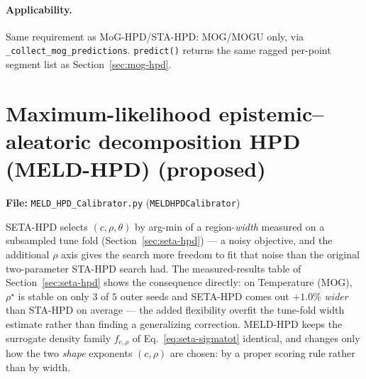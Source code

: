 \documentclass[11pt]{article}
\begin{document}
\paragraph{Applicability.} Same requirement as MoG-HPD/STA-HPD: MOG/MOGU only, via
\texttt{\_collect\_mog\_predictions}. \texttt{predict()} returns the same ragged per-point segment
list as Section~\ref{sec:mog-hpd}.

\section{Maximum-likelihood epistemic--aleatoric decomposition HPD (MELD-HPD) (proposed)}
\label{sec:meld-hpd}
\textbf{File:} \texttt{MELD\_HPD\_Calibrator.py} (\texttt{MELDHPDCalibrator})

SETA-HPD selects $(c,\rho,\theta)$ by arg-min of a region-\emph{width} measured on a subsampled
tune fold (Section~\ref{sec:seta-hpd}) --- a noisy objective, and the additional $\rho$ axis gives
the search more freedom to fit that noise than the original two-parameter STA-HPD search had. The
measured-results table of Section~\ref{sec:seta-hpd} shows the consequence directly: on
Temperature (MOG), $\rho^\star$ is stable on only $3$ of $5$ outer seeds and SETA-HPD comes out
$+1.0\%$ \emph{wider} than STA-HPD on average --- the added flexibility overfit the tune-fold width
estimate rather than finding a generalizing correction. MELD-HPD keeps the surrogate density family
$f_{c,\rho}$ of Eq.~\eqref{eq:seta-sigmatot} identical, and changes only how the two \emph{shape}
exponents $(c,\rho)$ are chosen: by a proper scoring rule rather than by width.
\end{document}
